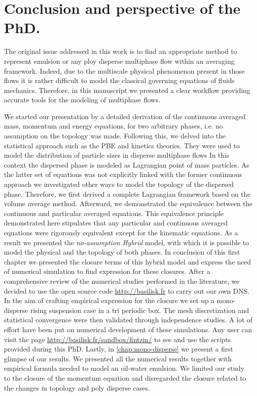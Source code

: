 \chapter{Conclusion and perspective of the PhD.}

The original issue addressed in this work is to find an appropriate method to represent emulsion or any ploy disperse multiphase flow within an averaging framework.
Indeed, due to the multiscale physical phenomenon present in those flows it is rather difficult to model the classical governing equations of fluids mechanics.  
Therefore, in this manuscript we presented a clear workflow providing accurate tools for the modeling of multiphase flows. 

We started our presentation by a detailed derivation of the continuous averaged mass, momentum and energy equations, for two arbitrary phases, i.e. no assumption on the topology was made.
Following this, we delved into the statistical approach such as the PBE and kinetics theories.
They were used to model the distribution of particle sizes in disperse multiphase flows
In this context the dispersed phase is modeled as Lagrangian point of mass particles. 
As the latter set of equations was not explicitly linked with the former continuous approach we investigated other ways to model the topology of the dispersed phase. 
Therefore, we first derived a complete Lagrangian framework based on the volume average method. 
Afterward, we demonstrated the equivalence between the continuous and particular averaged equations.
This equivalence principle demonstrated here stipulates that any particular and continuous averaged equations were rigorously equivalent except for the kinematic equations. 
As a result we presented the \textit{no-assumption Hybrid} model, with which it is possible to model the physical and the topology of both phases. 
In conclusion of this first chapter we presented the closure terms of this hybrid model and express the need of numerical simulation to find expression for these closures. 
After a comprehensive review of the numerical studies performed in the literature, we decided to use the open source code \url{http://basilisk.fr} to carry out our own DNS.
In the aim of crafting empirical expression for the closure we set up a mono-disperse rising suspension case in a tri periodic box.
The mesh discretization and statistical convergence were then validated through independence studies. 
A lot of effort have been put on numerical development of these simulations. 
Any user can visit the page \url{http://basilisk.fr/sandbox/fintzin/} to see and use the scripts provided during this PhD. 
Lastly, in \ref{chap:mono-disperse} we present a first glimpse of our results.
We presented all the numerical results together with empirical formula needed to model an oil-water emulsion. 
We limited our study to the closure of the momentum  equation and disregarded the closure related to the changes in topology and poly disperse cases. 

